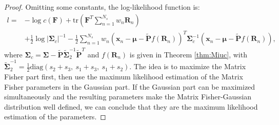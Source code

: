 \documentclass[12pt]{article}
\begin{document}
\begin{proof}
	Omitting some constants, the log-likelihood function is:
	\begin{equation}
		\begin{split}
			l = &-\log{c(\mathbf{F})} + \mathrm{tr}\left(\mathbf{F}^T\sum_{n=1}^{N_s}w_n\mathbf{R}_n\right) \\
			&+\frac{1}{2}\log{|\mathbf{\Sigma}_c|^{-1}} - \frac{1}{2}\sum_{n=1}^{N_s}w_n\left(\bm{x}_n-\bm{\mu}-\tilde{\mathbf{P}}f(\mathbf{R}_n)\right)^T\mathbf{\Sigma}_c^{-1}\left(\bm{x}_n-\bm{\mu}-\tilde{\mathbf{P}}f(\mathbf{R}_n)\right),
		\end{split}
	\end{equation}
	where $\mathbf{\Sigma}_c = \mathbf{\Sigma}-\tilde{\mathbf{P}}\tilde{\mathbf{\Sigma}}_2^{-1}\tilde{\mathbf{P}}^T$ and $f(\mathbf{R}_n)$ is given in Theorem \ref{thm:Miuc}, with $\tilde{\mathbf{\Sigma}}_2^{-1} = \frac{1}{2}\mathrm{diag}(s_2+s_3,\ s_1+s_3,\ s_1+s_2)$.
	The idea is to maximize the Matrix Fisher part first, then use the maximum likelihood estimation of the Matrix Fisher parameters in the Gaussian part.
	If the Gaussian part can be maximized simultaneously and the resulting parameters make the Matrix Fisher-Gaussian distribution well defined, we can conclude that they are the maximum likelihood estimation of the parameters.
	

\end{proof}
\end{document}
